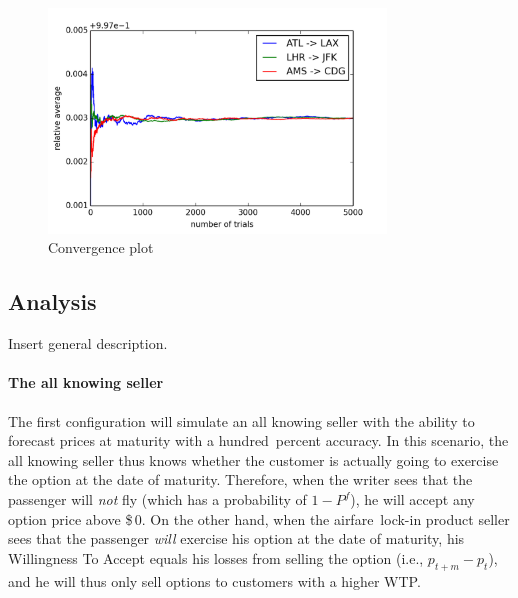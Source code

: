 \begin{figure}
\centering
\includegraphics[width=0.8\textwidth]{figures/ConvergencePlot_multiple}
\caption{Convergence plot}
\label{fig:ConvergencePlotMultiple}
\end{figure}


\subsection{Analysis}
Insert general description. \todo{}

\paragraph{The all knowing seller}
The first configuration will simulate an all knowing seller with the ability to forecast prices at maturity with a hundred~percent accuracy. In this scenario, the all knowing seller thus knows whether the customer is actually going to exercise the option at the date of maturity. Therefore, when the writer sees that the passenger will \emph{not} fly (which has a probability of $1-P^f$), he will accept any option price above \$\,0. On the other hand, when the airfare~lock-in product seller sees that the passenger \emph{will} exercise his option at the date of maturity, his Willingness To Accept equals his losses from selling the option (i.e., $p_{t+m} - p_t$), and he will thus only sell options to customers with a higher WTP. 


